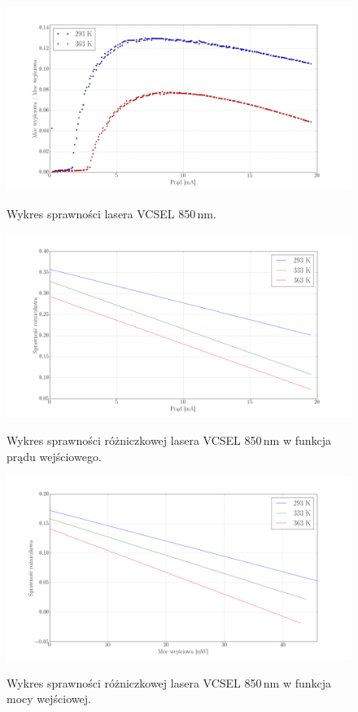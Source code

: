 \documentclass[a4paper, portrait,12pt]{report}
\begin{document}
\begin{figure}
\center
  \includegraphics[scale=0.30]{plot_vcsel850/plot_eff.png}
  \label{rys1}
  \caption{Wykres sprawności lasera VCSEL 850\,nm.} 
\end{figure}
\begin{figure}
\center
  \includegraphics[scale=0.30]{plot_vcsel850/plot_slope_eff_via_current.png}
  \label{rys1}
  \caption{Wykres sprawności różniczkowej lasera VCSEL 850\,nm w funkcja prądu wejściowego.} 
\end{figure}
\begin{figure}
\center
  \includegraphics[scale=0.30]{plot_vcsel850/plot_slope_eff_via_power.png}
  \label{rys1}
  \caption{Wykres sprawności różniczkowej lasera VCSEL 850\,nm w funkcja mocy wejściowej.} 
\end{figure}
\end{document}
